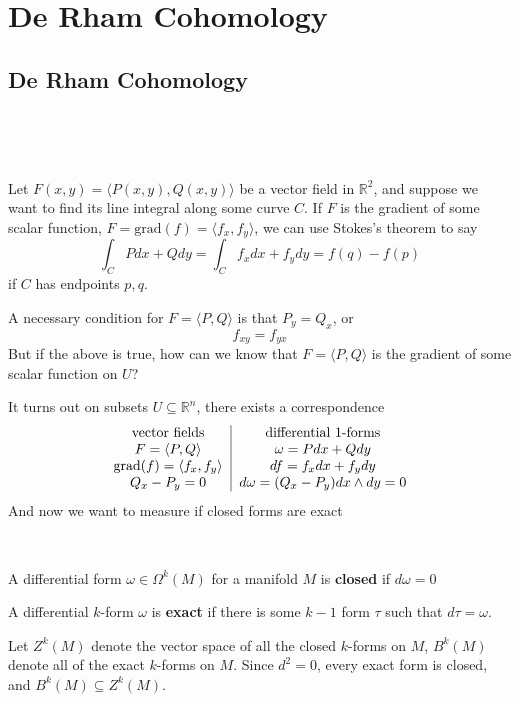 \documentclass{article}
\begin{document}
\section{De Rham Cohomology}

\subsection{De Rham Cohomology}
\

\begin{remark}
  \

  Let $F(x,y) = \langle P(x,y), Q(x,y) \rangle$ be a vector field in $\mathbb{R}^2$, and suppose we want to find its line integral along some curve $C$. If $F$ is the gradient of some scalar function, $F = \text{grad}(f) = \langle f_x, f_y\rangle$, we can use Stokes's theorem to say $$\int_C Pdx + Qdy = \int_C f_xdx + f_ydy = f(q) - f(p)$$if $C$ has endpoints $p, q$.

  A necessary condition for $F = \langle P, Q \rangle $ is that $P_y = Q_x$, or $$f_{xy} = f_{yx}$$But if the above is true, how can we know that $F = \langle P, Q \rangle$ is the gradient of some scalar function on $U$?

  It turns out on subsets $U \subseteq \mathbb{R}^n$, there exists a correspondence
  \[
    \begin{tabular}{c | c}
      vector fields & differential $1$-forms\\
      $F = \langle P, Q \rangle$ & $\omega = P dx + Q dy$\\
      $\text{grad}(f) = \langle f_x, f_y \rangle$ & $df = f_x dx + f_ydy$\\
      $Q_x - P_y = 0$ & $d\omega = (Q_x-P_y)dx\wedge dy = 0$
  \end{tabular}\]And now we want to measure if closed forms are exact
\end{remark}

\begin{definition}
  \

  A differential form $\omega \in \Omega^k(M)$ for a manifold $M$ is \textbf{closed} if $d\omega = 0$

  A differential $k$-form $\omega$ is \textbf{exact} if there is some $k-1$ form $\tau$ such that $d\tau = \omega$.

  Let $Z^k(M)$ denote the vector space of all the closed $k$-forms on $M$, $B^k(M)$ denote all of the exact $k$-forms on $M$. Since $d^2 = 0$, every exact form is closed, and $B^k(M) \subseteq Z^k(M)$.
\end{definition}
\end{document}
